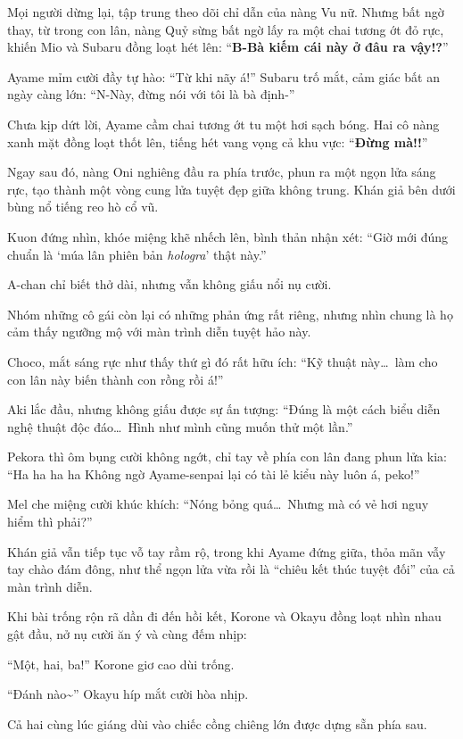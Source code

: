 \documentclass[../main.tex]{subfiles}
\begin{document}
Mọi người dừng lại, tập trung theo dõi chỉ dẫn của nàng Vu nữ. Nhưng bất ngờ thay, từ trong con lân, nàng Quỷ sừng bất ngờ lấy ra một chai tương ớt đỏ rực, khiến Mio và Subaru đồng loạt hét lên: ``\textbf{B-Bà kiếm cái này ở đâu ra vậy!?}''

Ayame mỉm cười đầy tự hào: ``Từ khi nãy á!'' Subaru trố mắt, cảm giác bất an ngày càng lớn: ``N-Này, đừng nói với tôi là bà định-''

Chưa kịp dứt lời, Ayame cầm chai tương ớt tu một hơi sạch bóng. Hai cô nàng xanh mặt đồng loạt thốt lên, tiếng hét vang vọng cả khu vực: ``\textbf{Đừng mà!!}''

Ngay sau đó, nàng Oni nghiêng đầu ra phía trước, phun ra một ngọn lửa sáng rực, tạo thành một vòng cung lửa tuyệt đẹp giữa không trung. Khán giả bên dưới bùng nổ tiếng reo hò cổ vũ.

Kuon đứng nhìn, khóe miệng khẽ nhếch lên, bình thản nhận xét: ``Giờ mới đúng chuẩn là `múa lân phiên bản \textit{hologra}' thật này.''

A-chan chỉ biết thở dài, nhưng vẫn không giấu nổi nụ cười.

Nhóm những cô gái còn lại có những phản ứng rất riêng, nhưng nhìn chung là họ cảm thấy ngưỡng mộ với màn trình diễn tuyệt hảo này.

Choco, mắt sáng rực như thấy thứ gì đó rất hữu ích: ``Kỹ thuật này\dots\ làm cho con lân này biến thành con rồng rồi á!''

Aki lắc đầu, nhưng không giấu được sự ấn tượng: ``Đúng là một cách biểu diễn nghệ thuật độc đáo\dots\ Hình như mình cũng muốn thử một lần.''

Pekora thì ôm bụng cười không ngớt, chỉ tay về phía con lân đang phun lửa kia: ``Ha \uparrow ha \downarrow ha \uparrow ha \downarrow Không ngờ Ayame-senpai lại có tài lẻ kiểu này luôn á, peko!''

Mel che miệng cười khúc khích: ``Nóng bỏng quá\dots\ Nhưng mà có vẻ hơi nguy hiểm thì phải?''

Khán giả vẫn tiếp tục vỗ tay rầm rộ, trong khi Ayame đứng giữa, thỏa mãn vẫy tay chào đám đông, như thể ngọn lửa vừa rồi là ``chiêu kết thúc tuyệt đối'' của cả màn trình diễn.

Khi bài trống rộn rã dần đi đến hồi kết, Korone và Okayu đồng loạt nhìn nhau gật đầu, nở nụ cười ăn ý và cùng đếm nhịp:

``Một, hai, ba!'' Korone giơ cao dùi trống.

``Đánh nào\~{}'' Okayu híp mắt cười hòa nhịp.

Cả hai cùng lúc giáng dùi vào chiếc cồng chiêng lớn được dựng sẵn phía sau.
\end{document}
